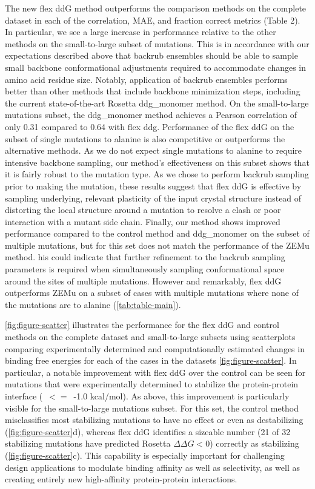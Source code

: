 The new flex ddG method outperforms the comparison methods on the complete dataset in each of the correlation, MAE, and fraction correct metrics (Table 2). In particular, we see a large increase in performance relative to the other methods on the small-to-large subset of mutations. This is in accordance with our expectations described above that backrub ensembles should be able to sample small backbone conformational adjustments required to accommodate changes in amino acid residue size. Notably, application of backrub ensembles performs better than other methods that include backbone minimization steps, including the current state-of-the-art Rosetta ddg\_monomer method. On the small-to-large mutations subset, the ddg\_monomer method achieves a Pearson correlation of only 0.31 compared to 0.64 with flex ddg.
Performance of the flex ddG on the subset of single mutations to alanine is also competitive or outperforms the alternative methods.
As we do not expect single mutations to alanine to require intensive backbone sampling, our method's effectiveness on this subset shows that it is fairly robust to the mutation type.
As we chose to perform backrub sampling prior to making the mutation, these results suggest that flex ddG is effective by sampling underlying, relevant plasticity of the input crystal structure instead of distorting the local structure around a mutation to resolve a clash or poor interaction with a mutant side chain.
Finally, our method shows improved performance compared to the control method and ddg\_monomer on the subset of multiple mutations, but for this set does not match the performance of the ZEMu method.
his could indicate that further refinement to the backrub sampling parameters is required when simultaneously sampling conformational space around the sites of multiple mutations.
However and remarkably, flex ddG outperforms ZEMu on a subset of cases with multiple mutations where none of the mutations are to alanine (\cref{tab:table-main}).

\cref{fig:figure-scatter} illustrates the performance for the flex ddG and control methods on the complete dataset and small-to-large subsets using scatterplots comparing experimentally determined and computationally estimated changes in binding free energies for each of the cases in the datasets \cref{fig:figure-scatter}. In particular, a notable improvement with flex ddG over the control can be seen for mutations that were experimentally determined to stabilize the protein-protein interface (\ddg\ $<=$\ -1.0 kcal/mol). As above, this improvement is particularly visible for the small-to-large mutations subset. For this set, the control method misclassifies most stabilizing mutations to have no effect or even as destabilizing (\cref{fig:figure-scatter}d), whereas flex ddG identifies a sizeable number (21 of 32 stabilizing mutations have predicted Rosetta $\Delta\Delta G < 0$) correctly as stabilizing (\cref{fig:figure-scatter}c). This capability is especially important for challenging design applications to modulate binding affinity as well as selectivity, as well as creating entirely new high-affinity protein-protein interactions.


